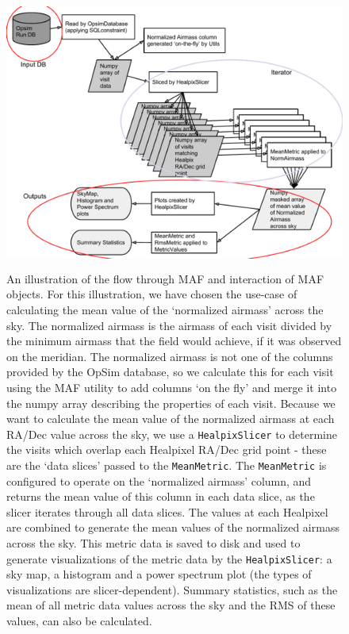 \documentclass[]{spie}  %
\begin{document}
\begin{figure}
\centering
\includegraphics[height=9cm]{figures/maf_flowchart}
\caption[]
{ \label{fig:flowchart}
An illustration of the flow through MAF and interaction of MAF
objects. For this illustration, we have chosen the use-case of
calculating the mean value of the `normalized airmass' across the
sky. The normalized airmass is the airmass of each visit divided by
the minimum airmass that the field would achieve, if it was observed
on the meridian. The normalized airmass is not one of the columns
provided by the OpSim database, so we calculate this for each visit
using the MAF utility to add columns `on the fly' and merge it into
the numpy array describing the properties of each visit. Because we
want to calculate the mean value of the normalized airmass at each
RA/Dec value across the sky, we use a {\tt HealpixSlicer} to determine
the visits which overlap each Healpixel RA/Dec grid point - these are
the `data slices' passed to the {\tt MeanMetric}. The {\tt MeanMetric}
is configured to operate on the `normalized airmass' column, and
returns the mean value of this column in each data slice, as the
slicer iterates through all data slices. The values at each Healpixel
are combined to generate the mean values of the normalized airmass
across the sky. This metric data is saved to disk and used to generate
visualizations of the metric data by the {\tt HealpixSlicer}: a sky
map, a histogram and a power spectrum plot (the types of
visualizations are slicer-dependent). Summary statistics, such as the
mean of all metric data values across the sky and the RMS of these
values, can also be calculated. }
\end{figure}
\end{document}
